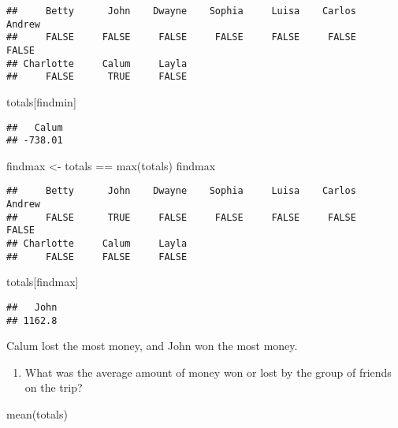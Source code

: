 \documentclass[]{article}
\newenvironment{Shaded}{\begin{snugshade}}{\end{snugshade}}
\newcommand{\FunctionTok}[1]{\textcolor[rgb]{0.00,0.00,0.00}{#1}}
\newcommand{\NormalTok}[1]{#1}
\newcommand{\OtherTok}[1]{\textcolor[rgb]{0.56,0.35,0.01}{#1}}
\newcommand{\SpecialCharTok}[1]{\textcolor[rgb]{0.00,0.00,0.00}{#1}}
\providecommand{\tightlist}{%
  \setlength{\itemsep}{0pt}\setlength{\parskip}{0pt}}
\begin{document}
\begin{verbatim}
##     Betty      John    Dwayne    Sophia     Luisa    Carlos    Andrew 
##     FALSE     FALSE     FALSE     FALSE     FALSE     FALSE     FALSE 
## Charlotte     Calum     Layla 
##     FALSE      TRUE     FALSE
\end{verbatim}

\begin{Shaded}
\begin{Highlighting}[]
\NormalTok{totals[findmin]}
\end{Highlighting}
\end{Shaded}

\begin{verbatim}
##   Calum 
## -738.01
\end{verbatim}

\begin{Shaded}
\begin{Highlighting}[]
\NormalTok{findmax }\OtherTok{\textless{}{-}}\NormalTok{ totals }\SpecialCharTok{==} \FunctionTok{max}\NormalTok{(totals)}
\NormalTok{findmax}
\end{Highlighting}
\end{Shaded}

\begin{verbatim}
##     Betty      John    Dwayne    Sophia     Luisa    Carlos    Andrew 
##     FALSE      TRUE     FALSE     FALSE     FALSE     FALSE     FALSE 
## Charlotte     Calum     Layla 
##     FALSE     FALSE     FALSE
\end{verbatim}

\begin{Shaded}
\begin{Highlighting}[]
\NormalTok{totals[findmax]}
\end{Highlighting}
\end{Shaded}

\begin{verbatim}
##   John 
## 1162.8
\end{verbatim}

Calum lost the most money, and John won the most money.

\begin{enumerate}
\def\labelenumi{(\alph{enumi})}
\setcounter{enumi}{6}
\tightlist
\item
  What was the average amount of money won or lost by the group of
  friends on the trip?
\end{enumerate}

\begin{Shaded}
\begin{Highlighting}[]
\FunctionTok{mean}\NormalTok{(totals)}
\end{Highlighting}
\end{Shaded}
\end{document}
